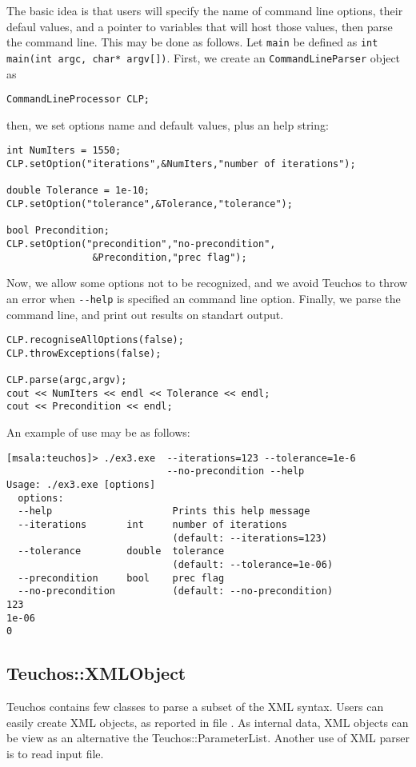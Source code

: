 The basic idea is that users will specify the name of command line
options, their defaul values, and a pointer to variables that will host
those values, then parse the command line. This may be done as
follows. Let \verb!main! be defined as \verb!int main(int argc, char* argv[])!. First, we create an \verb!CommandLineParser! object as
\begin{verbatim}
CommandLineProcessor CLP;
\end{verbatim}
then, we set options name and default values, plus an help string:
\begin{verbatim}    
int NumIters = 1550;
CLP.setOption("iterations",&NumIters,"number of iterations");

double Tolerance = 1e-10;    
CLP.setOption("tolerance",&Tolerance,"tolerance");
    
bool Precondition;
CLP.setOption("precondition","no-precondition",
               &Precondition,"prec flag");
\end{verbatim}
Now, we allow some options not to be recognized, and we avoid Teuchos to
throw an error when \verb!--help! is specified an command line
option. Finally, we parse the command line, and print out results on
standart output.
\begin{verbatim}    
CLP.recogniseAllOptions(false);
CLP.throwExceptions(false);
    
CLP.parse(argc,argv);
cout << NumIters << endl << Tolerance << endl;
cout << Precondition << endl;
\end{verbatim}
An example of use may be as follows:
\begin{verbatim}
[msala:teuchos]> ./ex3.exe  --iterations=123 --tolerance=1e-6  
                            --no-precondition --help
Usage: ./ex3.exe [options]
  options:
  --help                     Prints this help message
  --iterations       int     number of iterations
                             (default: --iterations=123)
  --tolerance        double  tolerance
                             (default: --tolerance=1e-06)
  --precondition     bool    prec flag
  --no-precondition          (default: --no-precondition)
123
1e-06
0
\end{verbatim}


\subsection{Teuchos::XMLObject}
\label{sec:teuchos:XML}

Teuchos contains few classes to parse a subset of the XML syntax. Users
can easily create XML objects, as reported in file
. 
As internal data, XML objects can be view as an alternative the
Teuchos::ParameterList. Another use of XML parser is to read input file.

